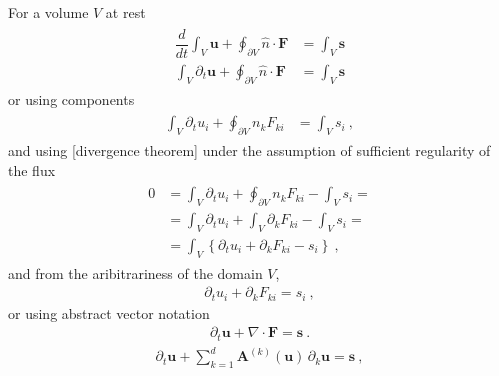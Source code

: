 \documentclass[letterpaper,10pt,english]{jupyterBook}
\begin{document}
\sphinxAtStartPar
For a volume \(V\) at rest
\begin{equation*}
\begin{split}\begin{aligned}
  \dfrac{d}{dt} \int_{V} \mathbf{u} + \oint_{\partial V} \hat{n} \cdot \mathbf{F} & = \int_{V} \mathbf{s} \\
  \int_{V} \partial_t    \mathbf{u} + \oint_{\partial V} \hat{n} \cdot \mathbf{F} & = \int_{V} \mathbf{s}
\end{aligned}\end{split}
\end{equation*}
\sphinxAtStartPar
or using components
\begin{equation*}
\begin{split}\begin{aligned}
  \int_{V} \partial_t u_i + \oint_{\partial V} n_k F_{ki} & = \int_{V} s_i \ ,
\end{aligned}\end{split}
\end{equation*}
\sphinxAtStartPar
and using {[}divergence theorem{]} under the assumption of sufficient regularity of the flux
\begin{equation*}
\begin{split}\begin{aligned}
  0
  & = \int_{V} \partial_t u_i + \oint_{\partial V} n_k F_{ki} - \int_{V} s_i = \\
  & = \int_{V} \partial_t u_i + \int_{V} \partial_k F_{ki} - \int_{V} s_i = \\
  & = \int_{V} \left\{ \partial_t u_i + \partial_k F_{ki} - s_i \right\} \ ,
\end{aligned}\end{split}
\end{equation*}
\sphinxAtStartPar
and from the aribitrariness of the domain \(V\),
\begin{equation*}
\begin{split}\partial_t u_i + \partial_k F_{ki} = s_i \ ,\end{split}
\end{equation*}
\sphinxAtStartPar
or using abstract vector notation
\begin{equation*}
\begin{split}\partial_t \mathbf{u} + \nabla \cdot \mathbf{F} = \mathbf{s} \ .\end{split}
\end{equation*}\begin{equation*}
\begin{split}\partial_t \mathbf{u} + \sum_{k=1}^{d} \mathbf{A}^{(k)}(\mathbf{u}) \, \partial_k \mathbf{u} = \mathbf{s} \ ,\end{split}
\end{equation*}
\end{document}
